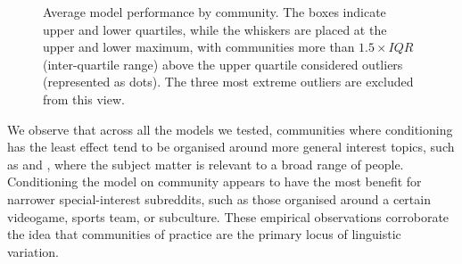 \documentclass[11pt]{article}
\begin{document}
\newcommand{\modelboxplot}[3]{
  \addplot+[
    boxplot={draw position=#3, box extend=0.3}, 
    draw=#2, mark=*, mark options={fill=#2, scale=0.5}, solid, fill=#2!10,
    area legend] 
    table [y=#1] {floats/comm.csv};
}
\begin{figure}[t]
\caption{
  Average model performance by community.
The boxes indicate upper and lower quartiles, while the whiskers are placed at the upper and lower maximum, with communities more than $1.5\times IQR$ (inter-quartile range) above the upper quartile considered outliers (represented as dots). The three most extreme outliers are excluded from this view.}%
\label{fig:comm-stratified-box}
\end{figure}

We observe that across all the models we
tested, communities where conditioning has the least effect tend to be
organised around more general interest topics, such as 
 and , where the subject
matter is relevant to a broad range of people.  Conditioning the model
on community appears to have the most benefit for narrower special-interest
subreddits, such as those organised around a certain videogame, sports
team, or subculture.  These empirical observations corroborate the idea that communities of practice
are the primary locus of linguistic variation.
\end{document}
